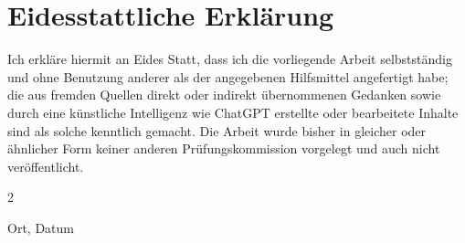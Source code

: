 \chapter*{Eidesstattliche Erklärung}

Ich erkläre hiermit an Eides Statt, dass ich die vorliegende Arbeit
selbstständig und ohne Benutzung anderer als der angegebenen
Hilfsmittel angefertigt habe; die aus fremden Quellen direkt oder indirekt
übernommenen Gedanken sowie durch eine künstliche Intelligenz wie
ChatGPT erstellte oder bearbeitete Inhalte sind als solche kenntlich
gemacht.
Die Arbeit wurde bisher in gleicher oder ähnlicher Form keiner anderen
Prüfungskommission vorgelegt und auch nicht veröffentlicht.

\bigskip
\bigskip
\bigskip
\bigskip
	
\begin{multicols}{2}
  \raggedright
  Ort, Datum
    
  \raggedleft
  \authorname
  
\end{multicols}
